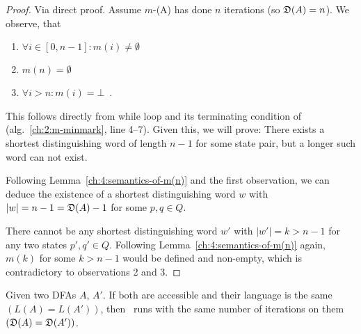 \begin{proof}
	Via direct proof. Assume $m$-\CompDist(A) has done $n$ iterations (so $\mathfrak{D}(A) = n$). We observe, that
	\begin{enumerate}
		\item $\forall i \in [0,n-1]\colon m(i) \neq \emptyset$
		\item $m(n)= \emptyset$
		\item $\forall i > n\colon m(i)= \bot$\ .
	\end{enumerate}
	This follows directly from while loop and its terminating condition of \CompDist (alg.~\ref{ch:2:m-minmark}, line 4--7). Given this, we will prove: There exists a shortest distinguishing word of length $n-1$ for some state pair, but a longer such word can not exist.

	
	Following Lemma~\ref{ch:4:semantics-of-m(n)} and the first observation, we can deduce the existence of a shortest distinguishing word $w$ with $|w| = n-1 = \mathfrak{D}(A)-1$ for some $p,q \in Q$.
	
	
	There cannot be any shortest distinguishing word $w'$ with $|w'| = k > n-1$ for any two states $p',q'\in Q$. Following Lemma~\ref{ch:4:semantics-of-m(n)} again, $m(k)$ for some $k > n-1$ would be defined and non-empty, which is contradictory to observations 2 and 3.
\end{proof}

\begin{theorem}
	Given two DFAs $A$, $A'$. If both are accessible and their language is the same $(L(A) = L(A'))$, then \CompDist\ runs with the same number of iterations on them $(\mathfrak{D}(A) = \mathfrak{D}(A'))$.
\end{theorem}


